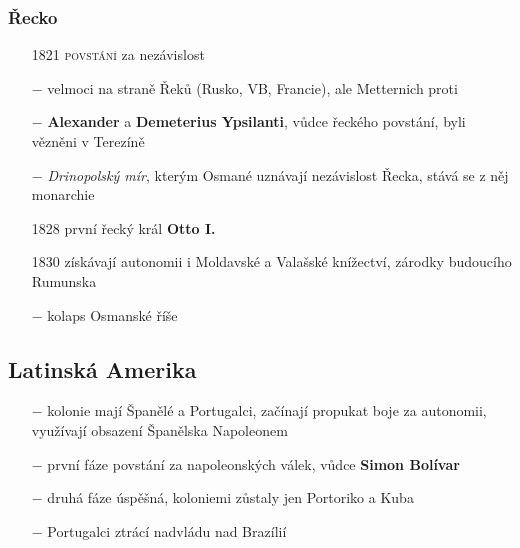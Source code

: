 \documentclass{article}
\begin{document}
\subsubsection*{Řecko}
\begin{itemize}
    \vspace{-0.5em}
    \setlength\itemsep{0.15em}
    \item[1821] \textsc{povstání} za nezávislost
    \item[$-$] velmoci na straně Řeků (Rusko, VB, Francie), ale Metternich proti
    \item[$-$] \textbf{Alexander} a \textbf{Demeterius Ypsilanti}, vůdce řeckého povstání, byli vězněni v Terezíně
    \item[$-$] \textit{Drinopolský mír}, kterým Osmané uznávají nezávislost Řecka, stává se z něj monarchie
    \item[1828] první řecký král \textbf{Otto I.}
    \item[1830] získávají autonomii i Moldavské a Valašské knížectví, zárodky budoucího Rumunska
    \item[$-$] kolaps Osmanské říše
\end{itemize}

\subsection*{Latinská Amerika}
\begin{itemize}
    \vspace{-0.5em}
    \setlength\itemsep{0.15em}
    \item[$-$] kolonie mají Španělé a Portugalci, začínají propukat boje za autonomii, využívají obsazení Španělska Napoleonem
    \item[$-$] první fáze povstání za napoleonských válek, vůdce \textbf{Simon Bolívar}
    \item[$-$] druhá fáze úspěšná, koloniemi zůstaly jen Portoriko a Kuba
    \item[$-$] Portugalci ztrácí nadvládu nad Brazílií
\end{itemize}
\end{document}
